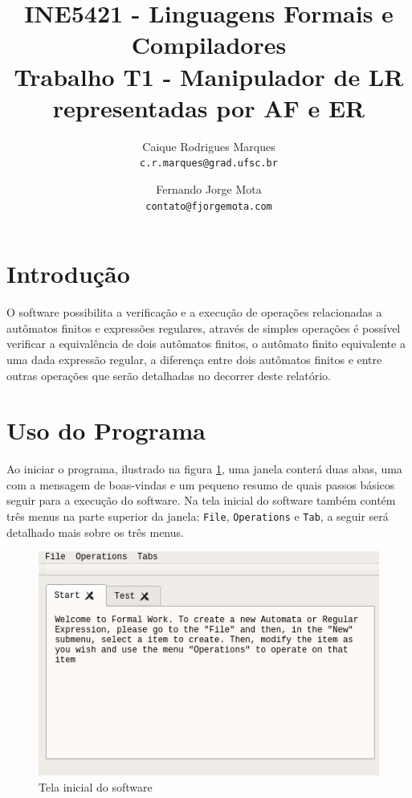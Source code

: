 \documentclass{article}
\title{\textbf{INE5421 - Linguagens Formais e Compiladores \\
        \large Trabalho T1 - Manipulador de LR representadas por AF e ER}}
\author{
    Caique Rodrigues Marques \\
    {\texttt{c.r.marques@grad.ufsc.br}}
    \and
    Fernando Jorge Mota \\
    {\texttt{contato@fjorgemota.com}}
    \vspace{-5mm}
}
\date{}
\begin{document}
\maketitle

\section*{Introdução}
    O software possibilita a verificação e a execução de operações relacionadas
    a autômatos finitos e expressões regulares, através de simples operações é
    possível verificar a equivalência de dois autômatos finitos, o autômato
    finito equivalente a uma dada expressão regular, a diferença entre dois
    autômatos finitos e entre outras operações que serão detalhadas no decorrer
    deste relatório.

\section{Uso do Programa}
\label{sec:uso}
    Ao iniciar o programa, ilustrado na figura \ref{fig:start_point}, uma
    janela conterá duas abas, uma com a mensagem de boas-vindas e um pequeno
    resumo de quais passos básicos seguir para a execução do software. Na tela
    inicial do software também contém três menus na parte superior da janela:
    \texttt{File}, \texttt{Operations} e \texttt{Tab}, a seguir será detalhado
    mais sobre os três menus.

    \begin{figure}[htp]
        \centering
        \includegraphics[width=.7\linewidth]{print_program.jpg}
        \caption{Tela inicial do software}
        \label{fig:start_point}
    \end{figure}
\end{document}
